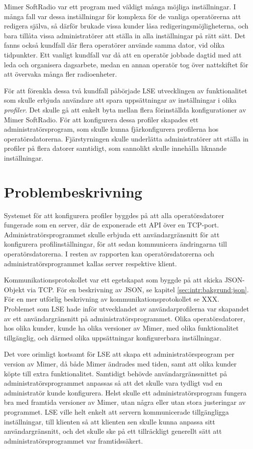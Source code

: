 \documentclass[swedish]{kththesis}
\begin{document}
Mimer SoftRadio var ett program med väldigt många möjliga inställningar. I många fall var dessa inställningar för komplexa för de vanliga operatörerna att redigera själva, så därför brukade vissa kunder låsa redigeringsmöjligheterna, och bara tillåta vissa administratörer att ställa in alla inställningar på rätt sätt. Det fanns också kundfall där flera operatörer använde samma dator, vid olika tidpunkter. Ett vanligt kundfall var då att en operatör jobbade dagtid med att leda och organisera dagsarbete, medan en annan operatör tog över nattskiftet för att övervaka många fler radioenheter.

För att förenkla dessa två kundfall påbörjade LSE utvecklingen av funktionalitet som skulle erbjuda användare att spara uppsättningar av inställningar i olika \textit{profiler}. Det skulle gå att enkelt byta mellan flera förinställda konfigurationer av Mimer SoftRadio. För att konfigurera dessa profiler skapades ett administratörsprogram, som skulle kunna fjärkonfigurera profilerna hos operatörsdatorerna. Fjärstyrningen skulle underlätta administratörer att ställa in profiler på flera datorer samtidigt, som sannolikt skulle innehålla liknande inställningar.

\section{Problembeskrivning}
Systemet för att konfigurera profiler byggdes på att alla operatörsdatorer fungerade som en server, där de exponerade ett API över en TCP-port. Administratörsprogrammet skulle erbjuda ett användargränsnitt för att konfigurera profilinställningar, för att sedan kommunicera ändringarna till operatörsdatorerna. I resten av rapporten kan operatörsdatorerna och administratörsprogrammet kallas server respektive klient.

Kommunikationsprotokollet var ett egetskapat som byggde på att skicka JSON-Objekt via TCP. För en beskrivning av JSON, se kapitel \ref{sec:intr:bakgrund:json}. För en mer utförlig beskrivning av kommunikationsprotokollet se XXX. Problemet som LSE hade inför utvecklandet av användarprofilerna var skapandet av ett användargränsnitt på administratörsprogrammet. Olika operatörsdatorer, hos olika kunder, kunde ha olika versioner av Mimer, med olika funktionalitet tillgänglig, och därmed olika uppsättningar konfigurerbara inställningar. 

Det vore orimligt kostsamt för LSE att skapa ett administratörsprogram per version av Mimer, då både Mimer ändrades med tiden, samt att olika kunder köpte till extra funktionalitet. Samtidigt behövde användargränssnittet på administratörsprogrammet anpassas så att det skulle vara tydligt vad en administratör kunde konfigurera. Helst skulle ett administratörsprogram fungera bra med framtida versioner av Mimer, utan några eller utan stora justeringar av programmet. LSE ville helt enkelt att servern kommunicerade tillgängligga inställningar, till klienten så att klienten sen skulle kunna anpassa sitt användargränsnitt, och det skulle ske på ett tillräckligt generellt sätt att administratörsprogrammet var framtidssäkert.
\end{document}

